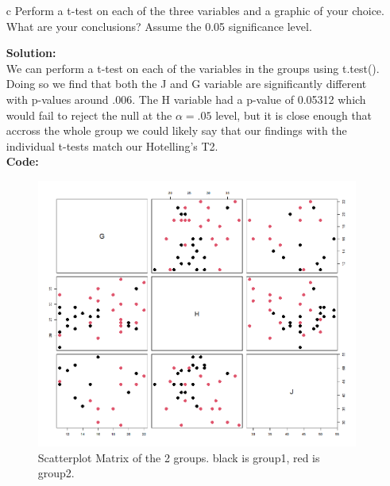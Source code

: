 \documentclass[12pt]{article}
\makeatletter
\theoremstyle{homework}
\newenvironment{exercise}[1]
{\def\@currentlabel{#1}\exercisecore}
{\endexercisecore}
\newcommand{\localhead}[1]{\par\smallskip\noindent\textbf{#1}\nobreak\\}%
\newcommand\solution{\localhead{Solution:}}
\makeatother
\begin{document}
\begin{exercise}{1}
\begin{enumerate}
    \item[c] Perform a t-test on each of the three variables and a graphic of your choice. What are your conclusions?  Assume the 0.05 significance level.\\
    \solution We can perform a t-test on each of the variables in the groups using t.test(). Doing so we find that both the J and G variable are significantly different 
    with p-values around .006. The H variable had a p-value of 0.05312 which would fail to reject the null at the $\alpha = .05$ level, but it is close enough that accross the whole 
    group we could likely say that our findings with the individual t-tests match our Hotelling's T2.\\
      \textbf{Code:}
        \begin{center}
        
        \end{center}
      \begin{figure}[H]
        \begin{center}
          \caption{Scatterplot Matrix of the 2 groups. black is group1, red is group2.}
        \includegraphics[width = \textwidth]{Rplot09.png}
        \end{center}
      \end{figure}







    \vspace{.15in} 
    

\end{enumerate}
\end{exercise}
\end{document}
